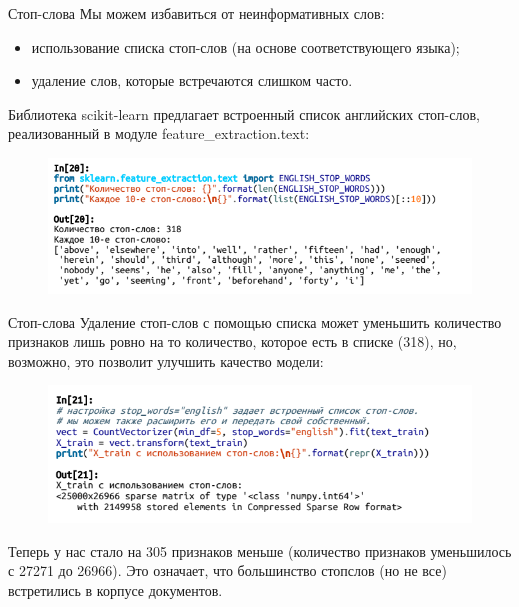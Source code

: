 \documentclass{beamer}
\begin{document}
\begin{frame}{Стоп-слова}
Мы можем избавиться от неинформативных слов:
\begin{itemize}
\item использование списка стоп-слов (на основе соответствующего языка);
\item удаление слов, которые встречаются слишком часто.
\end{itemize}
Библиотека scikit-learn предлагает встроенный список английских стоп-слов, реализованный в модуле feature\_extraction.text: 
\begin{figure}[h]
\centering
\includegraphics[scale=0.6]{images/lec09-pic19.png}
\end{figure}
\end{frame}

\begin{frame}{Стоп-слова}
Удаление стоп-слов с помощью списка может уменьшить количество признаков лишь ровно на то количество, которое есть в списке (318), но, возможно, это позволит улучшить качество
модели:
\begin{figure}[h]
\centering
\includegraphics[scale=0.6]{images/lec09-pic20.png}
\end{figure}
Теперь у нас стало на 305 признаков меньше (количество признаков уменьшилось с 27271 до 26966). Это означает, что большинство стопслов (но не все) встретились в корпусе документов.
\end{frame}
\end{document}
